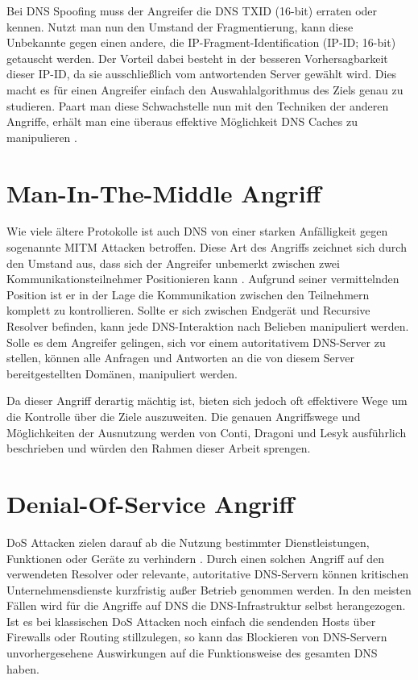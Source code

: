 Bei DNS Spoofing muss der Angreifer die DNS \ac{TXID} (16-bit) erraten oder kennen. Nutzt man nun den Umstand der Fragmentierung, kann diese Unbekannte gegen einen andere, die IP-Fragment-Identification (IP-ID; 16-bit) getauscht werden. Der Vorteil dabei besteht in der besseren Vorhersagbarkeit dieser IP-ID, da sie ausschließlich vom antwortenden Server gewählt wird. Dies macht es für einen Angreifer einfach den Auswahlalgorithmus des Ziels genau zu studieren. Paart man diese Schwachstelle nun mit den Techniken der anderen Angriffe, erhält man eine überaus effektive Möglichkeit DNS Caches zu manipulieren \cite{Herzberg2013}.

\section{Man-In-The-Middle Angriff}
\label{sec:attack-mitm}
Wie viele ältere Protokolle ist auch DNS von einer starken Anfälligkeit gegen sogenannte \ac{MITM} Attacken betroffen. Diese Art des Angriffs zeichnet sich durch den Umstand aus, dass sich der Angreifer unbemerkt zwischen zwei Kommunikationsteilnehmer Positionieren kann \cite{CAPEC94}. Aufgrund seiner vermittelnden Position ist er in der Lage die Kommunikation zwischen den Teilnehmern komplett zu kontrollieren. Sollte er sich zwischen Endgerät und Recursive Resolver befinden, kann jede DNS-Interaktion nach Belieben manipuliert werden. Solle es dem Angreifer gelingen, sich vor einem autoritativem DNS-Server zu stellen, können alle Anfragen und Antworten an die von diesem Server bereitgestellten Domänen, manipuliert werden. 

Da dieser Angriff derartig mächtig ist, bieten sich jedoch oft effektivere Wege um die Kontrolle über die Ziele auszuweiten. Die genauen Angriffswege und Möglichkeiten der Ausnutzung werden von Conti, Dragoni und Lesyk \cite{Conti2016} ausführlich beschrieben und würden den Rahmen dieser Arbeit sprengen.

\section{Denial-Of-Service Angriff}
\label{sec:attacks-dos}
\ac{DoS} Attacken  zielen darauf ab die Nutzung bestimmter Dienstleistungen, Funktionen oder Geräte zu verhindern \cite{BSIG040}. Durch einen solchen Angriff auf den verwendeten Resolver oder relevante, autoritative DNS-Servern können kritischen Unternehmensdienste kurzfristig außer Betrieb genommen werden. In den meisten Fällen wird für die Angriffe auf DNS die DNS-Infrastruktur selbst herangezogen. Ist es bei klassischen \ac{DoS} Attacken noch einfach die sendenden Hosts über Firewalls oder Routing stillzulegen, so kann das Blockieren von DNS-Servern unvorhergesehene Auswirkungen auf die Funktionsweise des gesamten DNS haben\cite{Kambourakis2008}. 

